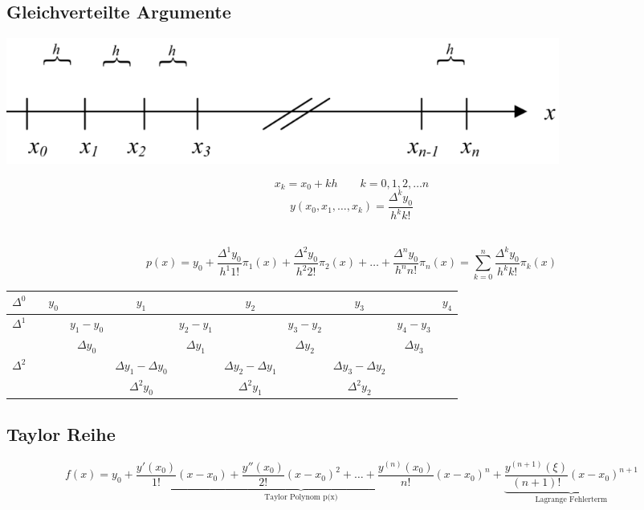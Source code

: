 \subsection{Gleichverteilte Argumente}

\begin{minipage}[c]{11.0cm}
	\includegraphics[width=0.8\textwidth]{bilder/gleichvArgum.png}	
\end{minipage}
\begin{minipage}[c]{6.0cm}
	$$x_k=x_0+k h\qquad k=0,1,2,\ldots n$$
	$$\boxed{y(x_0,x_1,\ldots,x_k)=\frac{\Delta^k y_0}{h^k k!}}$$
\end{minipage}
\hfill\\

$$p(x)=y_0+\frac{\Delta^1 y_0}{h^1 1!}\pi_1(x)+\frac{\Delta^2 y_0}{h^2 2!}\pi_2(x)+\ldots+\frac{\Delta^n y_0}{h^n n!}\pi_n(x)=\sum\limits_{k=0}^{n}{\frac{\Delta^k y_0}{h^k k!}\pi_k(x)}$$

\begin{center}
    \begin{tabular}{|l|lccccccccc|}
        \hline
        $\Delta^0$ && $y_0$ && $y_1$ && $y_2$ && $y_3$ && $y_4$ \\ \hline
        $\Delta^1$ &&   & $y_1-y_0$ && $y_2-y_1$ && $y_3-y_2$ && $y_4-y_3$ & \\
                   &&   & $\Delta y_0$ && $\Delta y_1$ && $\Delta y_2$ && $\Delta y_3$ & \\ \hline
        $\Delta^2$ && && $\Delta y_1-\Delta y_0$ && $\Delta y_2-\Delta y_1$ && $\Delta y_3-\Delta y_2$ && \\
                   && && $\Delta^2 y_0$ && $\Delta^2 y_1$ && $\Delta^2 y_2$ && \\ \hline
    \end{tabular}
\end{center}


\subsection{Taylor Reihe}
$$f(x)=\underset{\text{Taylor Polynom p(x)}}{\underbrace{y_0+\frac{y'(x_0)}{1!}(x-x_0)+\frac{y''(x_0)}{2!}(x-x_0)^2+\ldots+\frac{y^{(n)}(x_0)}{n!}(x-x_0)^n}}+\underset{\text{Lagrange Fehlerterm}}{\underbrace{\frac{y^{(n+1)}(\xi)}{(n+1)!}(x-x_0)^{n+1}}}$$
